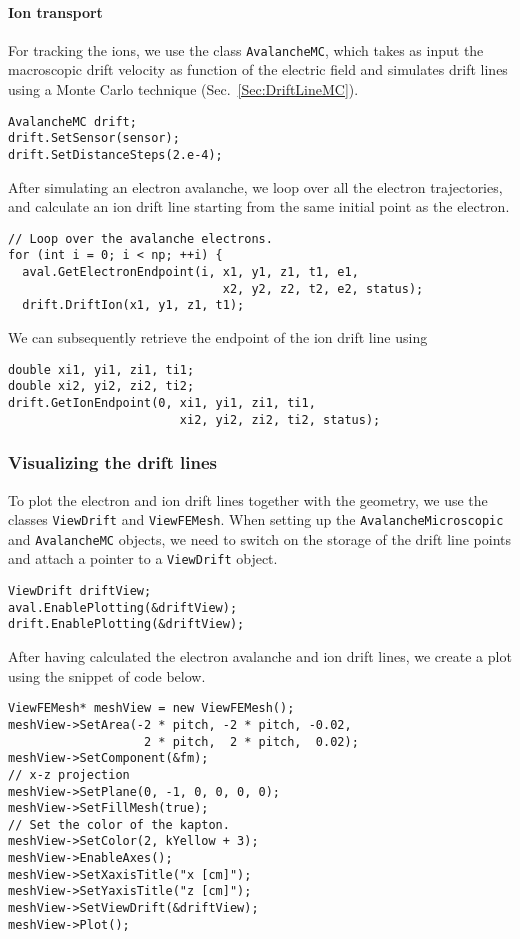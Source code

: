 \paragraph{Ion transport}
For tracking the ions, we use the class \texttt{AvalancheMC}, 
which takes as input the macroscopic drift velocity as 
function of the electric field and simulates drift lines using a 
Monte Carlo technique (Sec.~\ref{Sec:DriftLineMC}).
\begin{lstlisting}
AvalancheMC drift;
drift.SetSensor(sensor);
drift.SetDistanceSteps(2.e-4);
\end{lstlisting}
After simulating an electron avalanche, we loop over all the electron
trajectories, and calculate an ion drift line starting from the same
initial point as the electron.
\begin{lstlisting}
// Loop over the avalanche electrons.
for (int i = 0; i < np; ++i) {
  aval.GetElectronEndpoint(i, x1, y1, z1, t1, e1,
                              x2, y2, z2, t2, e2, status);
  drift.DriftIon(x1, y1, z1, t1);
\end{lstlisting}
We can subsequently retrieve the endpoint of the ion drift line using
\begin{lstlisting}
double xi1, yi1, zi1, ti1;
double xi2, yi2, zi2, ti2;
drift.GetIonEndpoint(0, xi1, yi1, zi1, ti1,
                        xi2, yi2, zi2, ti2, status);
\end{lstlisting}
\subsubsection{Visualizing the drift lines}
To plot the electron and ion drift lines together with the geometry, 
we use the classes \texttt{ViewDrift} and \texttt{ViewFEMesh}. 
When setting up the \texttt{AvalancheMicroscopic} and \texttt{AvalancheMC} 
objects, we need to switch on the storage of the drift line points and 
attach a pointer to a \texttt{ViewDrift} object.
\begin{lstlisting}
ViewDrift driftView;
aval.EnablePlotting(&driftView);
drift.EnablePlotting(&driftView);
\end{lstlisting}
After having calculated the electron avalanche and ion drift lines, we create a plot using the snippet of code below.
\begin{lstlisting}
ViewFEMesh* meshView = new ViewFEMesh();
meshView->SetArea(-2 * pitch, -2 * pitch, -0.02,
                   2 * pitch,  2 * pitch,  0.02);
meshView->SetComponent(&fm);
// x-z projection
meshView->SetPlane(0, -1, 0, 0, 0, 0);
meshView->SetFillMesh(true); 
// Set the color of the kapton.
meshView->SetColor(2, kYellow + 3);
meshView->EnableAxes();
meshView->SetXaxisTitle("x [cm]");
meshView->SetYaxisTitle("z [cm]");
meshView->SetViewDrift(&driftView);
meshView->Plot();
\end{lstlisting}
